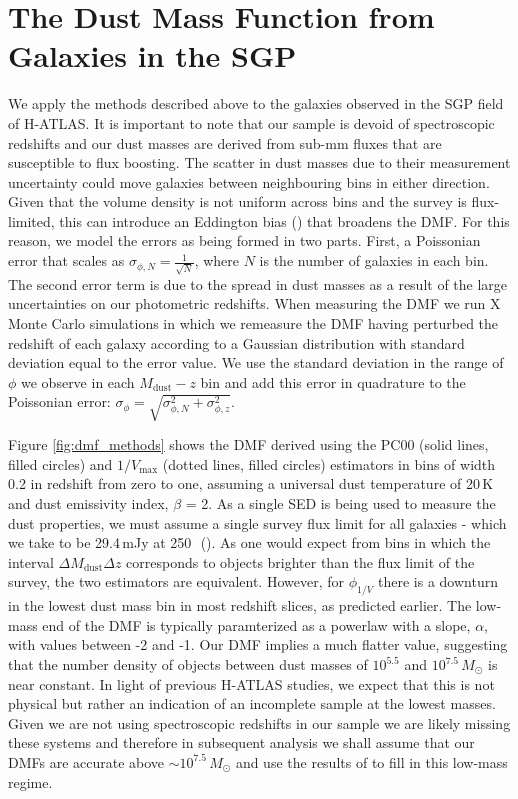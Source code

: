 \section{The Dust Mass Function from Galaxies in the SGP}

We apply the methods described above to the galaxies observed in the SGP field of H-ATLAS. It is important to note that our sample is devoid of spectroscopic redshifts and our dust masses are derived from sub-mm fluxes that are susceptible to flux boosting. The scatter in dust masses due to their measurement uncertainty could move galaxies between neighbouring bins in either direction. Given that the volume density is not uniform across bins and the survey is flux-limited, this can introduce an Eddington bias (\citealt{Eddington_1913}) that broadens the DMF. For this reason, we model the errors as being formed in two parts. First, a Poissonian error that scales as $\sigma_{\phi,N} = \frac{1}{\sqrt{N}}$, where $N$ is the number of galaxies in each bin. The second error term is due to the spread in dust masses as a result of the large uncertainties on our photometric redshifts. When measuring the DMF we run {\color{red} X} Monte Carlo simulations in which we remeasure the DMF having perturbed the redshift of each galaxy according to a Gaussian distribution with standard deviation equal to the error value. We use the standard deviation in the range of $\phi$ we observe in each $M_{\textrm{dust}} - z$ bin and add this error in quadrature to the Poissonian error: $\sigma_\phi = \sqrt{\sigma_{\phi,N}^2 + \sigma_{\phi,z}^2}$.

Figure \ref{fig:dmf_methods} shows the DMF derived using the PC00 (solid lines, filled circles) and $1/V_{\textrm{max}}$ (dotted lines, filled circles) estimators in bins of width 0.2 in redshift from zero to one, assuming a universal dust temperature of 20\,K and dust emissivity index, $\beta$ = 2. As a single SED is being used to measure the dust properties, we must assume a single survey flux limit for all galaxies - which we take to be 29.4\,mJy at 250\,\micron\ (\citealt{Valiante_2016}). As one would expect from bins in which the interval $\Delta M_{\textrm{dust}} \Delta z$ corresponds to objects brighter than the flux limit of the survey, the two estimators are equivalent. However, for $\phi_{1/V}$ there is a downturn in the lowest dust mass bin in most redshift slices, as predicted earlier. The low-mass end of the DMF is typically paramterized as a powerlaw with a slope, $\alpha$, with values between -2 and -1. Our DMF implies a much flatter value, suggesting that the number density of objects between dust masses of $10^{5.5}$ and $10^{7.5}\,M_{\odot}$ is near constant. In light of previous H-ATLAS studies, we expect that this is not physical but rather an indication of an incomplete sample at the lowest masses. Given we are not using spectroscopic redshifts in our sample we are likely missing these systems and therefore in subsequent analysis we shall assume that our DMFs are accurate above $\sim 10^{7.5}\,M_{\odot}$ and use the results of \citealt{Beeston_2018} to fill in this low-mass regime. 

